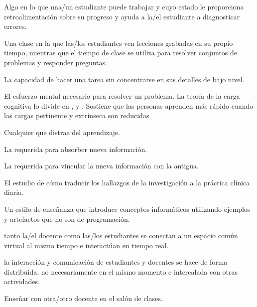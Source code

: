 \begin{description}
 Algo en lo que una/un estudiante puede trabajar
y cuyo estado le proporciona retroalimentación sobre su  progreso y ayuda a la/el estudiante a diagnosticar errores.

 Una clase en la que las/los estudiantes
ven lecciones grabadas en su propio tiempo, mientras que el tiempo de clase
se utiliza para resolver conjuntos de problemas y responder preguntas.

 La capacidad de hacer una tarea sin
concentrarse en sus detalles de bajo nivel.

 El esfuerzo mental necesario para resolver un problema.
La teoría de la carga cognitiva lo divide en
 ,
y .
Sostiene que las personas aprenden más rápido cuando las cargas pertinente y extrínseca son reducidas

 Cualquier 
que distrae del aprendizaje.

 La 
requerida para absorber nueva información.

 La 
requerida para vincular la nueva información con la antigua.

 El estudio de cómo traducir
los hallazgos de la investigación a la práctica clínica diaria.

 Un estilo de enseñanza que introduce
conceptos informáticos utilizando ejemplos y artefactos que no son de programación.

 tanto la/el docente como las/los estudiantes se conectan 
a un espacio común virtual al mismo tiempo e interactúan en tiempo real. 

 la interacción y comunicación de estudiantes y docentes
se hace de forma distribuida, no necesariamente en el mismo momento e intercalada con otras actividades. 

 Enseñar con otra/otro docente en el
salón de clases.


\end{description}
